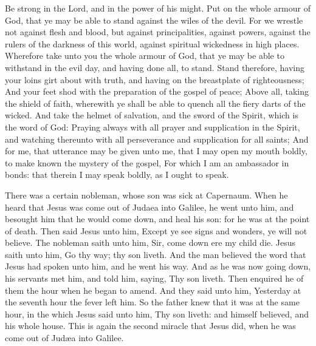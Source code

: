 Be strong in the Lord, and in the power of his might. Put on the whole armour of God, that ye may be able to stand against the wiles of the devil. For we wrestle not against flesh and blood, but against principalities, against powers, against the rulers of the darkness of this world, against spiritual wickedness in high places. Wherefore take unto you the whole armour of God, that ye may be able to withstand in the evil day, and having done all, to stand. Stand therefore, having your loins girt about with truth, and having on the breastplate of righteousness; And your feet shod with the preparation of the gospel of peace; Above all, taking the shield of faith, wherewith ye shall be able to quench all the fiery darts of the wicked. And take the helmet of salvation, and the sword of the Spirit, which is the word of God: Praying always with all prayer and supplication in the Spirit, and watching thereunto with all perseverance and supplication for all saints; And for me, that utterance may be given unto me, that I may open my mouth boldly, to make known the mystery of the gospel, For which I am an ambassador in bonds: that therein I may speak boldly, as I ought to speak.


\vspace{-0.25\baselineskip}

 There was a certain nobleman, whose son was sick at Capernaum. When he heard that Jesus was come out of Judaea into Galilee, he went unto him, and besought him that he would come down, and heal his son: for he was at the point of death. Then said Jesus unto him, Except ye see signs and wonders, ye will not believe. The nobleman saith unto him, Sir, come down ere my child die. Jesus saith unto him, Go thy way; thy son liveth. And the man believed the word that Jesus had spoken unto him, and he went his way. And as he was now going down, his servants met him, and told him, saying, Thy son liveth. Then enquired he of them the hour when he began to amend. And they said unto him, Yesterday at the seventh hour the fever left him. So the father knew that it was at the same hour, in the which Jesus said unto him, Thy son liveth: and himself believed, and his whole house. This is again the second miracle that Jesus did, when he was come out of Jud{\ae}a into Galilee.


